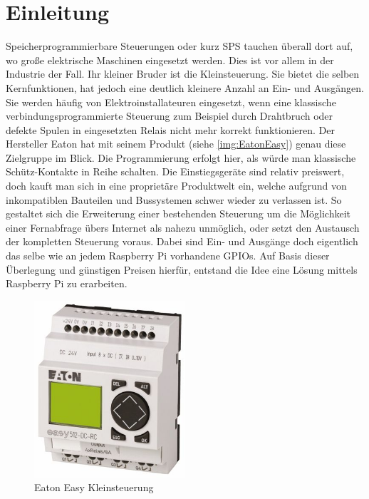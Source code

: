  \section{Einleitung}
 Speicherprogrammierbare Steuerungen oder kurz SPS tauchen überall dort auf, wo große elektrische Maschinen eingesetzt werden. Dies ist vor allem in der Industrie der Fall. Ihr kleiner Bruder ist die Kleinsteuerung. Sie bietet die selben Kernfunktionen, hat jedoch eine deutlich kleinere Anzahl an Ein- und Ausgängen. Sie werden häufig von Elektroinstallateuren eingesetzt, wenn eine klassische verbindungsprogrammierte Steuerung zum Beispiel durch Drahtbruch oder defekte Spulen in eingesetzten Relais nicht mehr korrekt funktionieren. Der Hersteller Eaton hat mit seinem Produkt  (siehe \autoref{img:EatonEasy}) genau diese Zielgruppe im Blick. Die Programmierung erfolgt hier, als würde man klassische Schütz-Kontakte in Reihe schalten. Die Einstiegsgeräte sind relativ preiswert, doch kauft man sich in eine proprietäre Produktwelt ein, welche aufgrund von inkompatiblen Bauteilen und Bussystemen schwer wieder zu verlassen ist. So gestaltet sich die Erweiterung einer bestehenden Steuerung um die Möglichkeit einer Fernabfrage übers Internet als nahezu unmöglich, oder setzt den Austausch der kompletten Steuerung voraus. Dabei sind Ein- und Ausgänge doch eigentlich das selbe wie an jedem Raspberry Pi vorhandene GPIOs. Auf Basis dieser Überlegung und günstigen Preisen hierfür, entstand die Idee eine Lösung mittels Raspberry Pi zu erarbeiten. 
 
  \begin{figure}[H]
 	\begin{center}
 		\includegraphics[width=0.5\textwidth]{./images/Easy.jpg}
 		\caption[Eaton Easy Kleinsteuerung]{Eaton Easy Kleinsteuerung \cite{URL:EatonEasy}}
 		\label{img:EatonEasy}
 	\end{center} 
 \end{figure}	
 
